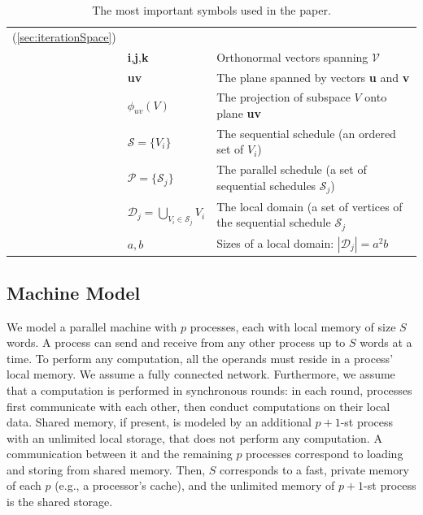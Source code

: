 \documentclass[sigplan,review,anonymous,10pt]{acmart}\settopmatter{printfolios=true,printccs=false,printacmref=false}
\begin{document}
\begin{table}[h]
\begin{tabular}{@{}l|ll@{}}
		(\cref{sec:iterationSpace})\\         
		& \textbf{i},\textbf{j},\textbf{k} & Orthonormal vectors spanning 
		$\mathcal{V}$\\
		& \textbf{uv} & The plane spanned by vectors \textbf{u} and \textbf{v}\\
		& $\phi_{uv}(V)$ & The projection of subspace $V$ onto plane 
		\textbf{uv}\\
		& $\mathcal{S} = \{V_i\}$ & The sequential schedule (an ordered set of 
		 $V_i$) \\ 
		& $\mathcal{P} = \{\mathcal{S}_j\}$ & The parallel schedule (a set of 
		sequential schedules $\mathcal{S}_j$) \\
		& $\mathcal{D}_j = \bigcup_{V_i \in \mathcal{S}_j}V_i $ & The local 
		domain 
		(a set of vertices 
		of the sequential schedule $\mathcal{S}_j$ \\
		& $a,b$ &  Sizes of a local domain: $|\mathcal{D}_j| = a^2b$\\
		
		\bottomrule
	\end{tabular}
	\caption{The most important symbols used in the paper.}
\vspace{-1em}
%
	\label{tab:symbols}
\end{table}
\vspace{-0.5em}


\subsection{Machine Model}
\label{sec:machineModel}

We model a parallel machine with $p$
processes, each with local memory of size $S$ words.
A process can send and receive from any other process up to $S$ words at 
a time.
To perform any computation, all the operands must reside in a process' local 
memory.
We assume a fully connected network. Furthermore, we assume that 
a computation is performed in synchronous rounds: in each round, processes 
first 
communicate with each other, then conduct computations on their local data.
Shared memory, if present, is modeled by an additional $p+1$-st process with 
an 
unlimited local storage, that does not perform any computation. A communication 
between it and the remaining $p$ processes correspond to loading and storing 
from shared memory. Then, $S$ corresponds to a fast, private memory of each 
$p$ (e.g., a processor's cache), and the unlimited memory of $p+1$-st process 
is the shared storage.
\end{document}
